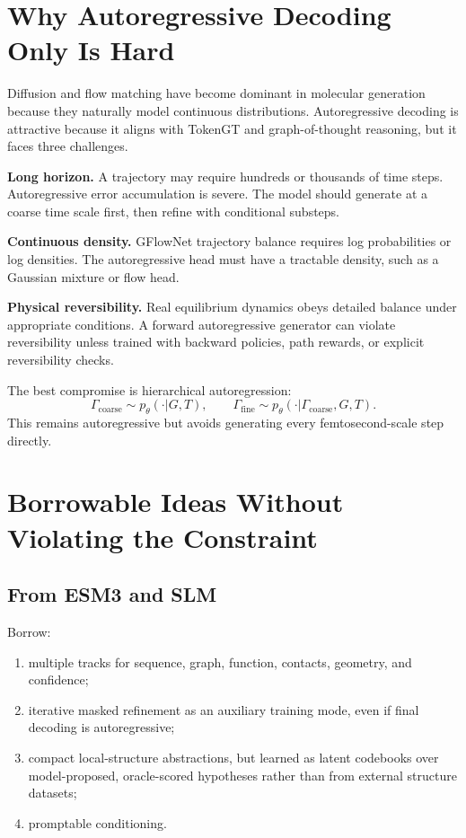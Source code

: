 \documentclass[11pt]{article}
\begin{document}
\section{Why Autoregressive Decoding Only Is Hard}

Diffusion and flow matching have become dominant in molecular generation because they naturally model continuous distributions. Autoregressive decoding is attractive because it aligns with TokenGT and graph-of-thought reasoning, but it faces three challenges.

\textbf{Long horizon.} A trajectory may require hundreds or thousands of time steps. Autoregressive error accumulation is severe. The model should generate at a coarse time scale first, then refine with conditional substeps.

\textbf{Continuous density.} GFlowNet trajectory balance requires log probabilities or log densities. The autoregressive head must have a tractable density, such as a Gaussian mixture or flow head.

\textbf{Physical reversibility.} Real equilibrium dynamics obeys detailed balance under appropriate conditions. A forward autoregressive generator can violate reversibility unless trained with backward policies, path rewards, or explicit reversibility checks.

The best compromise is hierarchical autoregression:
\[
\Gamma_{\mathrm{coarse}}
\sim p_\theta(\cdot|G,T),
\qquad
\Gamma_{\mathrm{fine}}
\sim p_\theta(\cdot|\Gamma_{\mathrm{coarse}},G,T).
\]
This remains autoregressive but avoids generating every femtosecond-scale step directly.

\section{Borrowable Ideas Without Violating the Constraint}

\subsection{From ESM3 and SLM}

Borrow:
\begin{enumerate}[leftmargin=2em]
  \item multiple tracks for sequence, graph, function, contacts, geometry, and confidence;
  \item iterative masked refinement as an auxiliary training mode, even if final decoding is autoregressive;
  \item compact local-structure abstractions, but learned as latent codebooks over model-proposed, oracle-scored hypotheses rather than from external structure datasets;
  \item promptable conditioning.
\end{enumerate}
\end{document}
